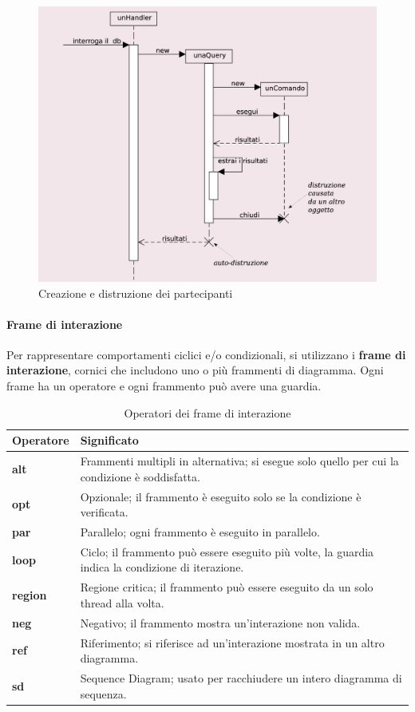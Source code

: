 \begin{figure}[H]
    \centering
    \includegraphics[width=0.75\linewidth]{assets/UML/sequence/sequence-3.png}
    \caption{Creazione e distruzione dei partecipanti}
\end{figure}

\paragraph{Frame di interazione}
Per rappresentare comportamenti ciclici e/o condizionali, si utilizzano i \textbf{frame di interazione}, cornici che includono uno o più frammenti di diagramma. Ogni frame ha un operatore e ogni frammento può avere una guardia.

\begin{table}[H]
    \centering
    \begin{tabularx}{\textwidth}{|l|X|}
        \hline
        \textbf{Operatore} & \textbf{Significato} \\
        \hline
        \textbf{alt} & Frammenti multipli in alternativa; si esegue solo quello per cui la condizione è soddisfatta. \\
        \hline
        \textbf{opt} & Opzionale; il frammento è eseguito solo se la condizione è verificata. \\
        \hline
        \textbf{par} & Parallelo; ogni frammento è eseguito in parallelo. \\
        \hline
        \textbf{loop} & Ciclo; il frammento può essere eseguito più volte, la guardia indica la condizione di iterazione. \\
        \hline
        \textbf{region} & Regione critica; il frammento può essere eseguito da un solo thread alla volta. \\
        \hline
        \textbf{neg} & Negativo; il frammento mostra un’interazione non valida. \\
        \hline
        \textbf{ref} & Riferimento; si riferisce ad un’interazione mostrata in un altro diagramma. \\
        \hline
        \textbf{sd} & Sequence Diagram; usato per racchiudere un intero diagramma di sequenza. \\
        \hline
    \end{tabularx}
    \caption{Operatori dei frame di interazione}
\end{table}

